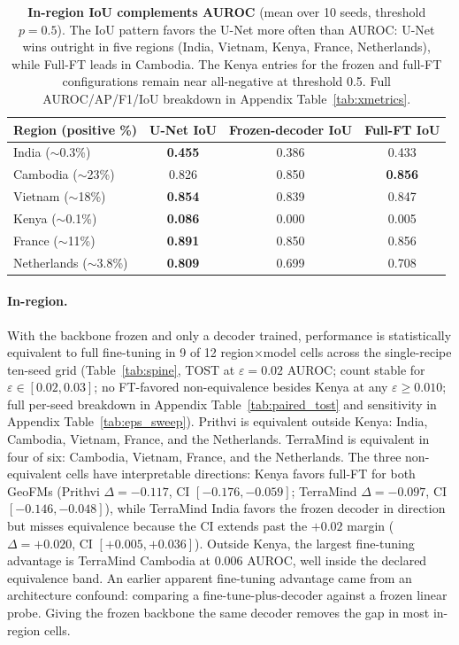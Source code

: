 \documentclass{article}
\newcommand{\tablebodygap}{\vspace{0.45em}}
\begin{document}
\begin{table}[H]\centering\small
\caption{\textbf{In-region IoU complements AUROC} (mean over 10 seeds,
threshold $p{=}0.5$). The IoU pattern favors the U-Net more often than AUROC:
U-Net wins outright in five regions (India, Vietnam, Kenya, France, Netherlands),
while Full-FT leads in Cambodia. The Kenya entries for the frozen and
full-FT configurations remain near all-negative at threshold 0.5. Full
AUROC/AP/F1/IoU breakdown in Appendix Table~\ref{tab:xmetrics}.}
\label{tab:iou_summary}
\tablebodygap
\begin{tabular}{lccc}
\toprule
Region (positive \%) & U-Net IoU & Frozen-decoder IoU & Full-FT IoU \\
\midrule
India ($\sim$0.3\%)        & \textbf{0.455} & 0.386 & 0.433 \\
Cambodia ($\sim$23\%)      & 0.826 & 0.850 & \textbf{0.856} \\
Vietnam ($\sim$18\%)       & \textbf{0.854} & 0.839 & 0.847 \\
Kenya ($\sim$0.1\%)        & \textbf{0.086} & 0.000 & 0.005 \\
France ($\sim$11\%)        & \textbf{0.891} & 0.850 & 0.856 \\
Netherlands ($\sim$3.8\%)  & \textbf{0.809} & 0.699 & 0.708 \\
\bottomrule
\end{tabular}
\end{table}
\FloatBarrier

\paragraph{In-region.} With the backbone frozen and only a decoder trained,
performance is statistically equivalent to full fine-tuning in 9 of 12
region$\times$model cells across the single-recipe ten-seed grid (Table~\ref{tab:spine},
TOST at $\varepsilon{=}0.02$ AUROC; count stable for $\varepsilon \in [0.02, 0.03]$;
no FT-favored non-equivalence besides Kenya at any $\varepsilon \geq 0.010$;
full per-seed breakdown in Appendix Table~\ref{tab:paired_tost} and sensitivity in
Appendix Table~\ref{tab:eps_sweep}). Prithvi is equivalent outside Kenya:
India, Cambodia, Vietnam, France, and the Netherlands. TerraMind is equivalent in
four of six: Cambodia, Vietnam, France, and the Netherlands. The three
non-equivalent cells have interpretable directions: Kenya favors full-FT for
both GeoFMs (Prithvi $\Delta{=}{-}0.117$, CI $[-0.176,-0.059]$; TerraMind
$\Delta{=}{-}0.097$, CI $[-0.146,-0.048]$), while TerraMind India favors the
frozen decoder in direction but misses equivalence because the CI extends past the
$+0.02$ margin ($\Delta{=}{+}0.020$, CI $[+0.005,+0.036]$). Outside Kenya, the
largest fine-tuning advantage is TerraMind Cambodia at $0.006$ AUROC, well inside
the declared equivalence band. An earlier apparent fine-tuning advantage came from
an architecture confound: comparing a fine-tune-plus-decoder against a frozen
linear probe. Giving the frozen backbone the same decoder removes the gap in most
in-region cells.
\end{document}
